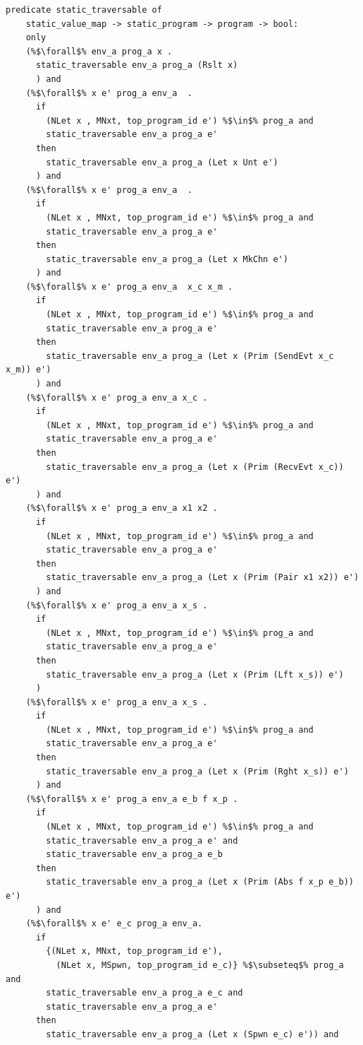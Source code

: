 \documentclass{article}
\begin{document}
\begin{lstlisting}[language=logic, escapechar=\%]
  predicate static_traversable of
    static_value_map -> static_program -> program -> bool:
    only
    (%$\forall$% env_a prog_a x .
      static_traversable env_a prog_a (Rslt x)
      ) and
    (%$\forall$% x e' prog_a env_a  .
      if
        (NLet x , MNxt, top_program_id e') %$\in$% prog_a and
        static_traversable env_a prog_a e'
      then
        static_traversable env_a prog_a (Let x Unt e')
      ) and
    (%$\forall$% x e' prog_a env_a  .
      if
        (NLet x , MNxt, top_program_id e') %$\in$% prog_a and
        static_traversable env_a prog_a e'
      then
        static_traversable env_a prog_a (Let x MkChn e')
      ) and
    (%$\forall$% x e' prog_a env_a  x_c x_m .
      if
        (NLet x , MNxt, top_program_id e') %$\in$% prog_a and
        static_traversable env_a prog_a e'
      then
        static_traversable env_a prog_a (Let x (Prim (SendEvt x_c x_m)) e')
      ) and
    (%$\forall$% x e' prog_a env_a x_c .
      if
        (NLet x , MNxt, top_program_id e') %$\in$% prog_a and
        static_traversable env_a prog_a e'
      then
        static_traversable env_a prog_a (Let x (Prim (RecvEvt x_c)) e')
      ) and
    (%$\forall$% x e' prog_a env_a x1 x2 .
      if
        (NLet x , MNxt, top_program_id e') %$\in$% prog_a and
        static_traversable env_a prog_a e'
      then
        static_traversable env_a prog_a (Let x (Prim (Pair x1 x2)) e')
      ) and
    (%$\forall$% x e' prog_a env_a x_s .
      if
        (NLet x , MNxt, top_program_id e') %$\in$% prog_a and
        static_traversable env_a prog_a e'
      then
        static_traversable env_a prog_a (Let x (Prim (Lft x_s)) e')
      )
    (%$\forall$% x e' prog_a env_a x_s .
      if
        (NLet x , MNxt, top_program_id e') %$\in$% prog_a and
        static_traversable env_a prog_a e'
      then
        static_traversable env_a prog_a (Let x (Prim (Rght x_s)) e')
      ) and
    (%$\forall$% x e' prog_a env_a e_b f x_p .
      if
        (NLet x , MNxt, top_program_id e') %$\in$% prog_a and
        static_traversable env_a prog_a e' and
        static_traversable env_a prog_a e_b
      then
        static_traversable env_a prog_a (Let x (Prim (Abs f x_p e_b)) e')
      ) and
    (%$\forall$% x e' e_c prog_a env_a.
      if
        {(NLet x, MNxt, top_program_id e'),
          (NLet x, MSpwn, top_program_id e_c)} %$\subseteq$% prog_a and
        static_traversable env_a prog_a e_c and
        static_traversable env_a prog_a e'
      then
        static_traversable env_a prog_a (Let x (Spwn e_c) e')) and


\end{lstlisting}
\end{document}
